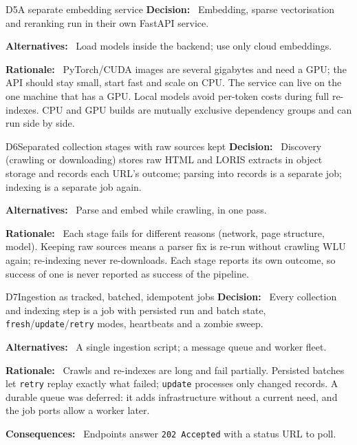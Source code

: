 \documentclass[11pt,letterpaper]{report}
\newcommand{\field}[1]{\textbf{\color{lauPurple}#1:}~}
\begin{document}
\begin{decision}{D5}{A separate embedding service}
\field{Decision} Embedding, sparse vectorisation and reranking run in their own FastAPI service.\par
\field{Alternatives} Load models inside the backend; use only cloud embeddings.\par
\field{Rationale} PyTorch/CUDA images are several gigabytes and need a GPU; the API should stay small,
start fast and scale on CPU. The service can live on the one machine that has a GPU. Local models
avoid per-token costs during full re-indexes. CPU and GPU builds are mutually exclusive dependency
groups and can run side by side.
\end{decision}

\begin{decision}{D6}{Separated collection stages with raw sources kept}
\field{Decision} Discovery (crawling or downloading) stores raw HTML and LORIS extracts in object
storage and records each URL's outcome; parsing into records is a separate job; indexing is a
separate job again.\par
\field{Alternatives} Parse and embed while crawling, in one pass.\par
\field{Rationale} Each stage fails for different reasons (network, page structure, model). Keeping raw
sources means a parser fix is re-run without crawling WLU again; re-indexing never re-downloads.
Each stage reports its own outcome, so success of one is never reported as success of the pipeline.
\end{decision}

\begin{decision}{D7}{Ingestion as tracked, batched, idempotent jobs}
\field{Decision} Every collection and indexing step is a job with persisted run and batch state,
\texttt{fresh}/\texttt{update}/\texttt{retry} modes, heartbeats and a zombie sweep.\par
\field{Alternatives} A single ingestion script; a message queue and worker fleet.\par
\field{Rationale} Crawls and re-indexes are long and fail partially. Persisted batches let
\texttt{retry} replay exactly what failed; \texttt{update} processes only changed records. A durable
queue was deferred: it adds infrastructure without a current need, and the job ports allow a worker
later.\par
\field{Consequences} Endpoints answer \texttt{202 Accepted} with a status URL to poll.
\end{decision}
\end{document}
